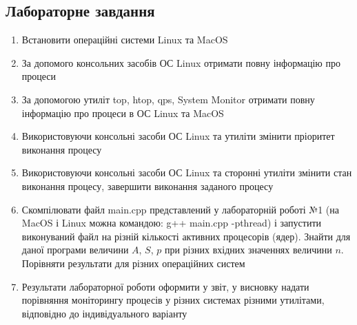 \documentclass{article}
\begin{document}
\begin{normalsize}
	\section*{Лабораторне завдання}
	\begin{enumerate}
		\item Встановити операційні системи Linux та MacOS
		\item За допомого консольних засобів ОС Linux отримати повну інформацію
		про процеси
		\item За допомогою утиліт top, htop, qps, System Monitor отримати повну
		інформацію про процеси в ОС Linux та MacOS
		\item Використовуючи консольні засоби ОС Linux та утиліти змінити
		пріоритет виконання процесу
		\item Використовуючи консольні засоби ОС Linux та сторонні утиліти
		змінити стан виконання процесу, завершити виконання заданого процесу
		\item Скомпілювати файл main.cpp представлений у лабораторній роботі №1
		(на MacOS і Linux можна командою: g++ main.cpp -pthread) і запустити
		виконуваний файл на різній кількості активних процесорів (ядер). Знайти для
		даної програми величини $A$, $S$, $p$  при різних вхідних значеннях величини $n$.
		Порівняти результати для різних операційних систем
		\item Результати лабораторної роботи оформити у звіт, у висновку надати
		порівняння моніторингу процесів у різних системах різними утилітами,
		відповідно до індивідуального варіанту
	\end{enumerate}


\end{normalsize}
\end{document}
